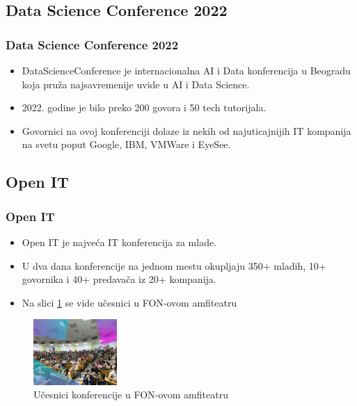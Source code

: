 \documentclass{beamer}
\begin{document}
\subsection{Data Science Conference 2022}
\begin{frame}[fragile]\frametitle{Data Science Conference 2022}

\begin{itemize}
    \item DataScienceConference je internacionalna AI i Data konferencija u Beogradu koja pruža najsavremenije uvide u AI i Data Science.
    \item 2022. godine je bilo preko 200 govora i 50 tech tutorijala.
    \item Govornici na ovoj konferenciji dolaze iz nekih od najuticajnijih IT kompanija na svetu poput Google, IBM, VMWare i EyeSee.

\end{itemize}

\end{frame}

\subsection{Open IT}
\begin{frame}[fragile]\frametitle{Open IT}

\begin{itemize}
    \item Open IT je najveća IT konferencija za mlade.
    \item U dva dana konferencije na jednom mestu okupljaju 350+ mladih, 10+ govornika i 40+ predavača iz 20+ kompanija.
    \item Na slici \ref{fig:openit} se vide učesnici u FON-ovom amfiteatru
\end{itemize}

\begin{figure}[h!]
        \centering\includegraphics[height=2.5cm]{slike/openit.jpg} 
        \caption{Učesnici konferencije u FON-ovom amfiteatru}
        \label{fig:openit}
\end{figure}


\end{frame}
\end{document}
